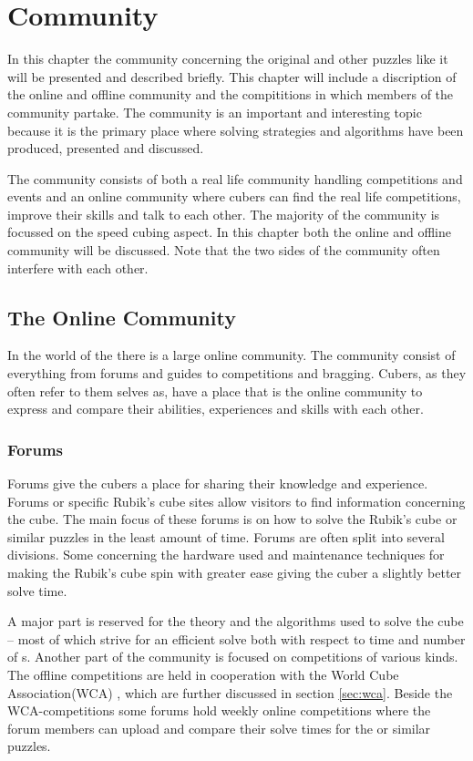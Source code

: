 \chapter{Community}
\startTop{}
In this chapter the community concerning the original \rubik{} and other puzzles like it will be presented and described briefly. This chapter will include a discription of the online and offline community and the compititions in which members of the community partake. The community is an important and interesting topic because it is the primary place where solving strategies and algorithms have been produced, presented and discussed. 
\endTop{}

The \rubik{} community consists of both a real life community handling competitions and events and an online community where cubers can find the real life competitions, improve their skills and talk to each other. The majority of the community is focussed on the speed cubing aspect. In this chapter both the online and offline community will be discussed. Note that the two sides of the community often interfere with each other. 

\section{The Online Community}
In the world of the \rubik{} there is a large online community. The community consist of everything from forums and guides to competitions and bragging. Cubers, as they often refer to them selves as, have a place that is the online community to express and compare their abilities, experiences and skills with each other. 

\subsection{Forums}
Forums give the cubers a place for sharing their knowledge and experience\cite{speedsolving.com}\cite{speedcubing.dk}\cite{wca}. Forums or specific Rubik's cube sites allow visitors to find information concerning the cube. The main focus of these forums is on how to solve the Rubik's cube or similar puzzles in the least amount of time. Forums are often split into several divisions. Some concerning the hardware used and maintenance techniques for making the Rubik's cube spin with greater ease giving the cuber a slightly better solve time.

A major part is reserved for the theory and the algorithms used to solve the cube -- most of which strive for an efficient solve both with respect to time and number of \twist{}s.
Another part of the community is focused on competitions of various kinds. The offline competitions are held in cooperation with the World Cube Association(WCA) \cite{wca}, which are further discussed in section \ref{sec:wca}. Beside the WCA-competitions some forums hold weekly online competitions where the forum members can upload and compare their solve times for the \rubik{} or similar puzzles. 

